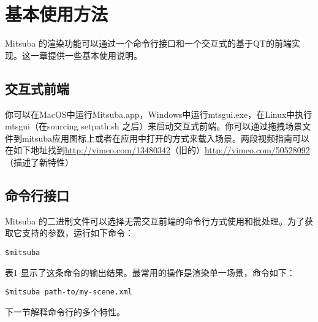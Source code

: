 \chapter{基本使用方法}
Mitsuba 的渲染功能可以通过一个命令行接口和一个交互式的基于QT的前端实现。这一章提供一些基本使用说明。

\section{交互式前端}
你可以在MacOS中运行Mitsuba.app，Windows中运行mtsgui.exe，在Linux中执行mtsgui（在sourcing setpath.sh 之后）来启动交互式前端。你可以通过拖拽场景文件到mitsuba应用图标上或者在应用中打开的方式来载入场景。两段视频指南可以在如下地址找到\url{http://vimeo.com/13480342}（旧的）\url{http://vimeo.com/50528092}（描述了新特性）

\section{命令行接口}
Mitsuba 的二进制文件可以选择无需交互前端的命令行方式使用和批处理。为了获取它支持的参数，运行如下命令：
\begin{lstlisting}
$mitsuba
\end{lstlisting}
\par
表1 显示了这条命令的输出结果。最常用的操作是渲染单一场景，命令如下：
\begin{lstlisting}
$mitsuba path-to/my-scene.xml
\end{lstlisting}
\par
下一节解释命令行的多个特性。


